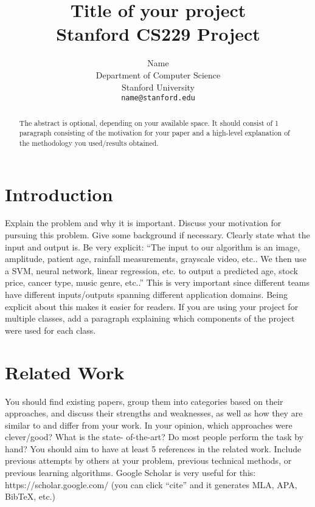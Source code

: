 \documentclass{article}
\title{
  Title of your project \\
  \vspace{1em}
  \small{\normalfont Stanford CS229 Project}  %
}
\author{
  Name \\
  Department of Computer Science \\
  Stanford University \\
  \texttt{name@stanford.edu} \\
}
\begin{document}
\maketitle

\begin{abstract}
The abstract is optional, depending on your available space. It should consist of 1 paragraph consisting of the motivation for your paper and a high-level explanation of the methodology you used/results obtained.
\end{abstract}



\section{Introduction}
Explain the problem and why it is important. Discuss your motivation for pursuing this problem. Give some background if necessary. Clearly state what the input and output is. Be very explicit: “The input to our algorithm is an {image, amplitude, patient age, rainfall measurements, grayscale video, etc.}. We then use a {SVM, neural network, linear regression, etc.} to output a predicted {age, stock price, cancer type, music genre, etc.}.” This is very important since different teams have different inputs/outputs spanning different application domains. Being explicit about this makes it easier for readers. If you are using your project for multiple classes, add a paragraph explaining which components of the project were used for each class.

\section{Related Work}
You should find existing papers, group them into categories based on their approaches, and discuss their strengths and weaknesses, as well as how they are similar to and differ from your work. In your opinion, which approaches were clever/good? What is the state- of-the-art? Do most people perform the task by hand? You should aim to have at least 5 references in the related work. Include previous attempts by others at your problem, previous technical methods, or previous learning algorithms. Google Scholar is very useful for this: https://scholar.google.com/ (you can click “cite” and it generates MLA, APA, BibTeX, etc.)
\end{document}
